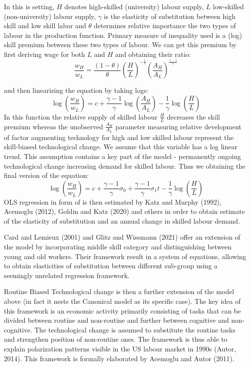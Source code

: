 \documentclass{article}
\begin{document}
In this is setting, $H$ denotes high-skilled (university) labour supply, $L$ low-skilled (non-university) labour supply, $\gamma$ is the elasticity of substitution between high skill and low skill labor and $\theta$ determines relative importance the two types of labour in the production function. Primary measure of inequality used is a (log) skill premium between these two types of labour. We can get this premium by first deriving wage for both $L$ and $H$ and obtaining their ratio:
\[\frac{w_{H}}{w_{L}} = \frac{(1 - \theta)}{\theta} \left(\frac{H}{L}\right)^{-\frac{1}{\gamma}}\left(\frac{A_{H}}{A_{L}}\right)^{\frac{\gamma - 1}{\gamma}}\]

and then linearizing the equation by taking logs:
\[\log(\frac{w_{H}}{w_{L}}) = c + \frac{\gamma - 1}{\gamma}\log(\frac{A_{H}}{A_{L}}) - \frac{1}{\gamma}\log(\frac{H}{L})\]
In this function the relative supply of skilled labour $\frac{H}{L}$ decreases the skill premium whereas the unobserved $\frac{A_{H}}{A_{L}}$ parameter measuring relative development of factor augmenting technology for high and low skilled labour represent the skill-biased technological change. We assume that this variable has a log linear trend. This assumption contains a key part of the model - permanently ongoing technological change increasing demand for skilled labour. Thus we obtaining the final version of the equation:
\begin{equation}
\label{eqn:STBC_regression}
\log(\frac{w_{H}}{w_{L}}) = c + \frac{\gamma - 1}{\gamma}\sigma_0 + \frac{\gamma - 1}{\gamma}\sigma_{1}t - \frac{1}{\gamma}\log(\frac{H}{L})
\end{equation}
OLS regression in form of is then estimated by Katz and Murphy (1992), Acemoglu (2012), Goldin and Katz (2020) and others in order to obtain estimate of the elasticity of substitution and an annual change in skilled labour demand.

Card and Lemieux (2001) and Glitz and Wissmann (2021) offer an extension of the model by incorporating middle skill category and distinguishing between young and old workers. Their framework result in a system of equations, allowing to obtain elasticities of substitution between different sub-group using a seemingly unrelated regression framework.

Routine Biased Technological change is then a further extension of the model above (in fact it nests the Canonical model as its specific case). The key idea of this framework is an economic activity primarily consisting of tasks that can be divided between routine and non-routine and further between cognitive and non-cognitive. The technological change is assumed to substitute the routine tasks and strengthen position of non-routine ones. The framework is thus able to explain polarization patterns visible in the US labour market in 1990s (Autor, 2014). This framework is formally elaborated by Acemoglu and Autor (2011).
\end{document}
